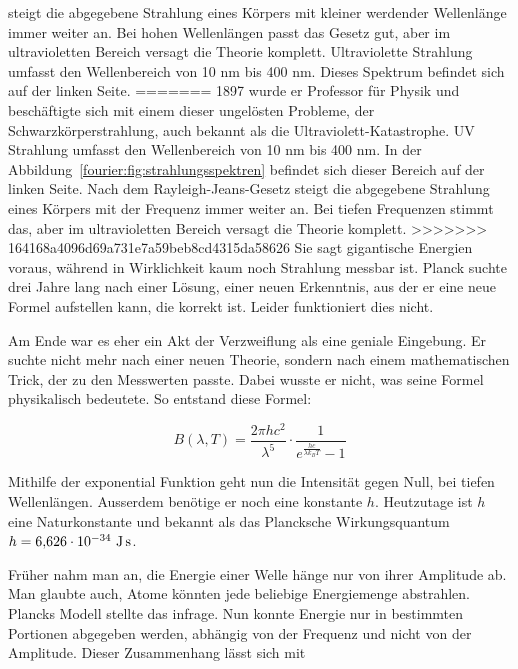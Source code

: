 	steigt die abgegebene Strahlung eines Körpers mit kleiner werdender Wellenlänge immer weiter an. 
	Bei hohen Wellenlängen passt das Gesetz gut, aber im ultravioletten Bereich versagt die Theorie komplett. Ultraviolette Strahlung umfasst den Wellenbereich von 10 nm bis 400 nm. 
	Dieses Spektrum befindet sich auf der linken Seite.
=======
	1897 wurde er Professor für Physik und beschäftigte sich mit einem dieser ungelösten Probleme, der Schwarzkörperstrahlung, auch bekannt als die Ultraviolett-Katastrophe. 
	UV Strahlung umfasst den Wellenbereich von 10 nm bis 400 nm. 
	In der Abbildung~\ref{fourier:fig:strahlungsspektren} befindet sich dieser Bereich auf der linken Seite.
	Nach dem Rayleigh-Jeans-Gesetz steigt die abgegebene Strahlung eines Körpers mit der Frequenz immer weiter an. 
	Bei tiefen Frequenzen stimmt das, aber im ultravioletten Bereich versagt die Theorie komplett. 
>>>>>>> 164168a4096d69a731e7a59beb8cd4315da58626
	Sie sagt gigantische Energien voraus, während in Wirklichkeit kaum noch Strahlung messbar ist.
	Planck suchte drei Jahre lang nach einer Lösung, einer neuen Erkenntnis, aus der er eine neue Formel aufstellen kann, die korrekt ist. 
	Leider funktioniert dies nicht.
	
	
	Am Ende war es eher ein Akt der Verzweiflung als eine geniale Eingebung. Er suchte nicht mehr nach einer neuen Theorie, sondern nach einem mathematischen Trick, der zu den Messwerten passte. 
	Dabei wusste er nicht, was seine Formel physikalisch bedeutete.
	So entstand diese Formel: 
	
	\begin{equation}
		B(\lambda, T) = \frac{2 \pi h c^2}{\lambda^5} \cdot \frac{1}{e^{\frac{h c}{\lambda k_B T}} - 1}
	\end{equation}
	
	Mithilfe der exponential Funktion geht nun die Intensität gegen Null, bei tiefen Wellenlängen. Ausserdem benötige er noch eine konstante $h$. Heutzutage ist $h$ eine Naturkonstante und bekannt als das Plancksche Wirkungsquantum $h = 6{,}626 \cdot 10^{-34} \ \text{J\,s}$. 
	


	
	
	
	Früher nahm man an, die Energie einer Welle hänge nur von ihrer Amplitude ab. 
	Man glaubte auch, Atome könnten jede beliebige Energiemenge abstrahlen. 
	Plancks Modell stellte das infrage. 
	Nun konnte Energie nur in bestimmten Portionen abgegeben werden, abhängig von der Frequenz und nicht von der Amplitude. 
	Dieser Zusammenhang lässt sich mit  
	
